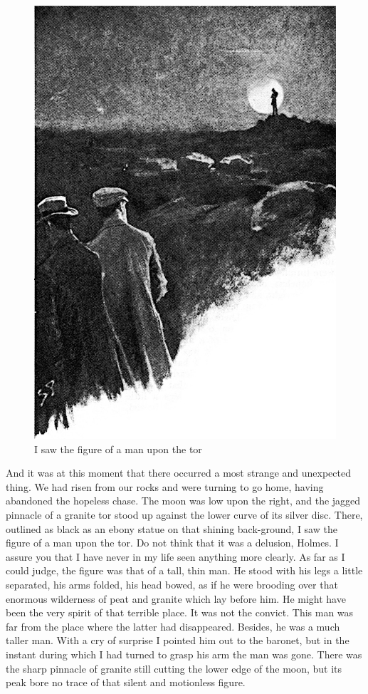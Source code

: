\documentclass[paper=5.5in:8.5in,BCOR=7mm,twoside,DIV=calc,12pt,usegeometry,openany,chapterprefix,endperiod]{scrbook} %
\begin{document}
\begin{figure}[tbph]
\centering
\includegraphics[width=\linewidth]{09_manontor}
\caption{I saw the figure of a man upon the tor}
\end{figure}

And it was at this moment that there occurred a most strange and unexpected thing. We had risen from our rocks and were turning to go home, having abandoned the hopeless chase. The moon was low upon the right, and the jagged pinnacle of a granite tor stood up against the lower curve of its silver disc. There, outlined as black as an ebony statue on that shining back-ground, I saw the figure of a man upon the tor. Do not think that it was a delusion, Holmes. I assure you that I have never in my life seen anything more clearly. As far as I could judge, the figure was that of a tall, thin man. He stood with his legs a little separated, his arms folded, his head bowed, as if he were brooding over that enormous wilderness of peat and granite which lay before him. He might have been the very spirit of that terrible place. It was not the convict. This man was far from the place where the latter had disappeared. Besides, he was a much taller man. With a cry of surprise I pointed him out to the baronet, but in the instant during which I had turned to grasp his arm the man was gone. There was the sharp pinnacle of granite still cutting the lower edge of the moon, but its peak bore no trace of that silent and motionless figure.
\end{document}
